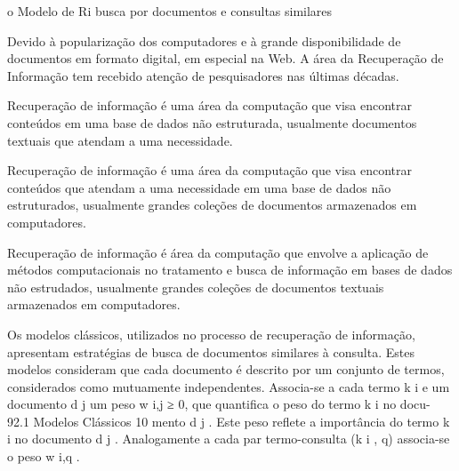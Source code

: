





o Modelo de Ri busca por documentos e consultas similares


Devido à popularização dos computadores e à grande disponibilidade de documentos em formato digital, em especial na Web. A área da Recuperação de Informação tem recebido atenção de pesquisadores nas últimas décadas.



Recuperação de informação é uma área da computação que visa encontrar conteúdos em uma base de dados não estruturada, usualmente documentos textuais que atendam a uma necessidade. 


Recuperação de informação é uma área da computação que visa encontrar conteúdos que atendam a uma necessidade em uma base de dados não estruturados, usualmente grandes coleções de documentos armazenados em computadores.


Recuperação de informação é área da computação que envolve a aplicação de métodos computacionais no tratamento e busca de informação em bases de dados não estrudados, usualmente grandes coleções de documentos textuais armazenados em computadores.







Os modelos clássicos, utilizados no processo de recuperação de informação, apresentam estratégias de busca de documentos similares à consulta. Estes modelos consideram que cada documento é descrito por um conjunto de termos, considerados como mutuamente independentes. Associa-se a cada termo k i e um documento d j um peso w i,j ≥ 0, que quantifica o peso do termo k i no docu- 92.1 Modelos Clássicos 10 mento d j . Este peso reflete a importância do termo k i no documento d j . Analogamente a cada par termo-consulta (k i , q) associa-se o peso w i,q .
